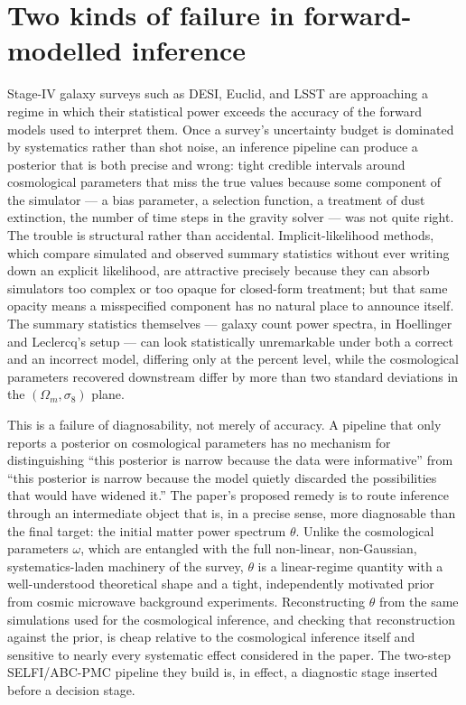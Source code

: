 \documentclass[11pt]{article}
\begin{document}
\section{Two kinds of failure in forward-modelled inference}

Stage-IV galaxy surveys such as DESI, Euclid, and LSST are approaching a regime in which their statistical power exceeds the accuracy of the forward models used to interpret them. Once a survey's uncertainty budget is dominated by systematics rather than shot noise, an inference pipeline can produce a posterior that is both precise and wrong: tight credible intervals around cosmological parameters that miss the true values because some component of the simulator --- a bias parameter, a selection function, a treatment of dust extinction, the number of time steps in the gravity solver --- was not quite right. The trouble is structural rather than accidental. Implicit-likelihood methods, which compare simulated and observed summary statistics without ever writing down an explicit likelihood, are attractive precisely because they can absorb simulators too complex or too opaque for closed-form treatment; but that same opacity means a misspecified component has no natural place to announce itself. The summary statistics themselves --- galaxy count power spectra, in Hoellinger and Leclercq's setup --- can look statistically unremarkable under both a correct and an incorrect model, differing only at the percent level, while the cosmological parameters recovered downstream differ by more than two standard deviations in the $(\Omega_m,\sigma_8)$ plane.

This is a failure of diagnosability, not merely of accuracy. A pipeline that only reports a posterior on cosmological parameters has no mechanism for distinguishing ``this posterior is narrow because the data were informative'' from ``this posterior is narrow because the model quietly discarded the possibilities that would have widened it.'' The paper's proposed remedy is to route inference through an intermediate object that is, in a precise sense, more diagnosable than the final target: the initial matter power spectrum $\theta$. Unlike the cosmological parameters $\omega$, which are entangled with the full non-linear, non-Gaussian, systematics-laden machinery of the survey, $\theta$ is a linear-regime quantity with a well-understood theoretical shape and a tight, independently motivated prior from cosmic microwave background experiments. Reconstructing $\theta$ from the same simulations used for the cosmological inference, and checking that reconstruction against the prior, is cheap relative to the cosmological inference itself and sensitive to nearly every systematic effect considered in the paper. The two-step SELFI/ABC-PMC pipeline they build is, in effect, a diagnostic stage inserted before a decision stage.
\end{document}
